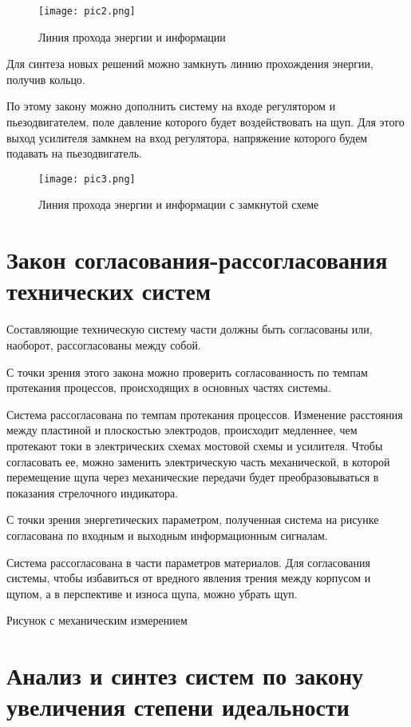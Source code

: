 \begin{figure}[h!]
	\centering
	\texttt{[image: pic2.png]}
	\caption{Линия прохода энергии и информации}
	\label{}
\end{figure}

Для синтеза новых решений можно замкнуть линию прохождения энергии, получив кольцо. 

По этому закону можно дополнить систему на входе регулятором и пьезодвигателем, поле давление которого будет воздействовать на щуп. Для этого выход усилителя замкнем на вход регулятора, напряжение которого будем подавать на пьезодвигатель.

\begin{figure}[h!]
	\centering
	\texttt{[image: pic3.png]}
	\caption{Линия прохода энергии и информации с замкнутой схеме}
	\label{sogl}
\end{figure}

\section{Закон согласования-рассогласования технических систем}

Составляющие техническую систему части должны быть согласованы или, наоборот, рассогласованы между собой.

С точки зрения этого закона можно проверить согласованность по темпам протекания процессов, происходящих в основных частях системы.

Система рассогласована по темпам протекания процессов. Изменение расстояния между пластиной и плоскостью электродов, происходит медленнее, чем протекают токи в электрических схемах мостовой схемы и усилителя. Чтобы согласовать ее, можно заменить электрическую часть механической, в которой перемещение щупа через механические передачи будет преобразовываться в показания стрелочного индикатора.

С точки зрения энергетических параметром, полученная система на рисунке~ согласована по входным и выходным информационным сигналам.

Система рассогласована в части параметров материалов. Для согласования системы, чтобы избавиться от вредного явления трения между корпусом и щупом, а в перспективе и износа щупа, можно убрать щуп.

Рисунок с механическим измерением

\section{Анализ и синтез систем по закону увеличения степени идеальности}

